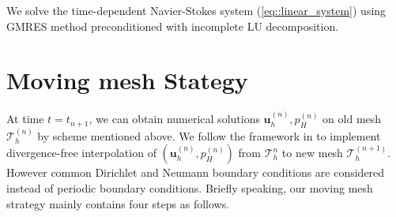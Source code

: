 \documentclass[mathpazo]{aamm}
\begin{document}
   We solve the time-dependent Navier-Stokes system
   (\ref{eq::linear_system}) using GMRES method preconditioned with
   incomplete LU decomposition.

   
\section{Moving mesh  Stategy}
   \label{sec6} At time $t = t_{n + 1}$, we can obtain
   numerical solutions $\mathbf{u}_h^{(n)}, p_H^{(n)}$ on old
   mesh $\mathcal{T}_h^{(n)}$ by scheme mentioned above. We follow the
   framework in \cite{di2005moving} to implement divergence-free
   interpolation of $(\mathbf{u}_h^{(n)}, p_H^{(n)})$ from
   $\mathcal{T}_h^n$ to new mesh $\mathcal{T}_h^{(n + 1)}$.
   However common Dirichlet and Neumann boundary
   conditions are considered instead of periodic boundary conditions.
   Briefly speaking, our moving mesh strategy mainly contains four
   steps as follows.
\end{document}
